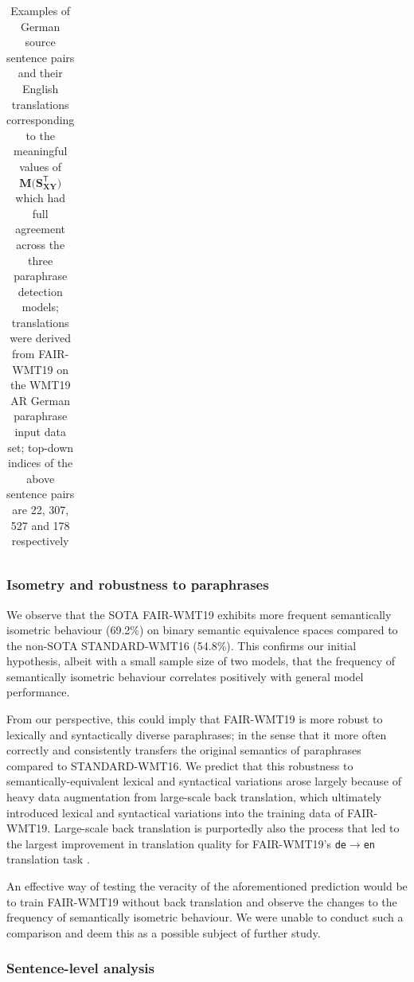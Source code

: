 \documentclass[11pt,a4paper]{article}
\begin{document}
\begin{table}[t!]
\begin{tabular*}{\textwidth}{ll p{5.9cm} p{5.9cm}}
    \hline
  \end{tabular*}
  \caption{Examples of German source sentence pairs and their English
    translations corresponding to the meaningful values of
    $\mathbf{M(S_{XY}^{\mathsf{T}}})$ which had full agreement across the three
    paraphrase detection models; translations were derived from FAIR-WMT19 on
    the WMT19 AR German paraphrase input data set; top-down indices of the above
    sentence pairs are 22, 307, 527 and 178 respectively}
  \label{isometry_examples_sentences}
\end{table}

\subsubsection{Isometry and robustness to paraphrases}

We observe that the SOTA FAIR-WMT19 exhibits more frequent semantically
isometric behaviour (69.2$\%$) on binary semantic equivalence spaces compared to
the non-SOTA STANDARD-WMT16 (54.8$\%$). This confirms our initial hypothesis,
albeit with a small sample size of two models, that the frequency of
semantically isometric behaviour correlates positively with general model
performance.

From our perspective, this could imply that FAIR-WMT19 is more robust to
lexically and syntactically diverse paraphrases; in the sense that it more often
correctly and consistently transfers the original semantics of paraphrases
compared to STANDARD-WMT16. We predict that this robustness to
semantically-equivalent lexical and syntactical variations arose largely because
of heavy data augmentation from large-scale back translation, which ultimately
introduced lexical and syntactical variations into the training data of
FAIR-WMT19. Large-scale back translation is purportedly also the process that
led to the largest improvement in translation quality for FAIR-WMT19's
\texttt{de$\rightarrow$en} translation task \cite{ng2019facebook}.

An effective way of testing the veracity of the aforementioned prediction would
be to train FAIR-WMT19 without back translation and observe the changes to the
frequency of semantically isometric behaviour. We were unable to conduct such a
comparison and deem this as a possible subject of further study.

\subsubsection{Sentence-level analysis}
\end{document}
